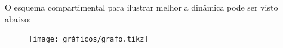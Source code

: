 \documentclass{article}
\begin{document}

\noindent O esquema compartimental para ilustrar melhor a dinâmica pode ser visto abaixo:

\begin{figure}[!ht]
\centering
\texttt{[image: gráficos/grafo.tikz]}
\end{figure}
\newpage
\end{document}
